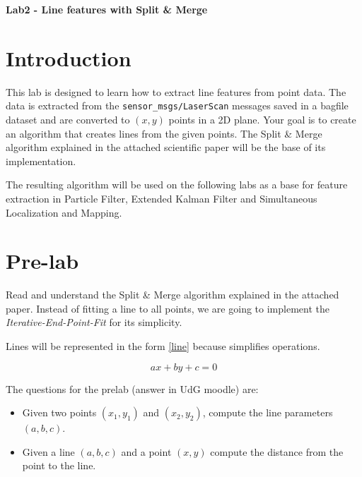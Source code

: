 \documentclass[a4paper,10pt]{article}
\begin{document}
\marginsize{2cm}{2cm}{2cm}{2cm}

\begin{center}
\Large \textbf{Lab2 - Line features with Split \& Merge}
\end{center}

\section{Introduction}

This lab is designed to learn how to extract line features from point data. The data is extracted from the \texttt{sensor\_msgs/LaserScan} messages saved in a bagfile dataset and are converted to $(x,y)$ points in a 2D plane. Your goal is to create an algorithm that creates lines from the given points. The Split \& Merge algorithm explained in the attached scientific paper will be the base of its implementation.

The resulting algorithm will be used on the following labs as a base for feature extraction in Particle Filter, Extended Kalman Filter and Simultaneous Localization and Mapping. 

\section{Pre-lab}

Read and understand the Split \& Merge algorithm explained in the attached paper. Instead of fitting a line to all points, we are going to implement the \emph{Iterative-End-Point-Fit} for its simplicity.

Lines will be represented in the form \eqref{line} because simplifies operations.

\begin{equation}
    a x + b y + c = 0 \label{line}
\end{equation}

\noindent
The questions for the prelab (answer in UdG moodle) are:

\begin{itemize}
    \item Given two points $(x_1, y_1)$ and $(x_2, y_2)$, compute the line parameters $(a,b,c)$.
    \item Given a line $(a,b,c)$ and a point $(x,y)$ compute the distance from the point to the line.
\end{itemize}
\end{document}
